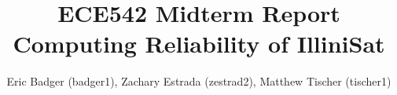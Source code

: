 \documentclass[notitlepage,groupedaddress]{IEEEtran}
\begin{document}
\title{ECE542 Midterm Report\\ Computing Reliability of IlliniSat}
\author{Eric Badger (badger1), Zachary Estrada (zestrad2), Matthew Tischer
(tischer1)}

\maketitle











\end{document}
